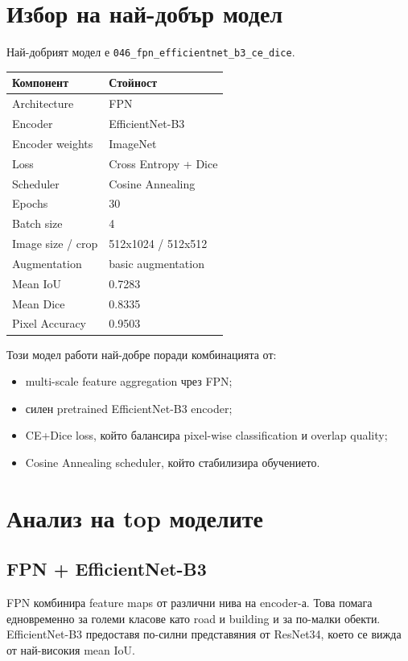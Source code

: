 \documentclass[12pt,a4paper]{article}
\newcommand{\code}[1]{\texttt{#1}}
\begin{document}
\section{Избор на най-добър модел}

Най-добрият модел е \code{046\_fpn\_efficientnet\_b3\_ce\_dice}.

\begin{longtable}{p{} p{}}
\toprule
Компонент & Стойност \\
\midrule
Architecture & FPN \\
Encoder & EfficientNet-B3 \\
Encoder weights & ImageNet \\
Loss & Cross Entropy + Dice \\
Scheduler & Cosine Annealing \\
Epochs & 30 \\
Batch size & 4 \\
Image size / crop & 512x1024 / 512x512 \\
Augmentation & basic augmentation \\
Mean IoU & 0.7283 \\
Mean Dice & 0.8335 \\
Pixel Accuracy & 0.9503 \\
\bottomrule
\end{longtable}

Този модел работи най-добре поради комбинацията от:

\begin{itemize}
  \item multi-scale feature aggregation чрез FPN;
  \item силен pretrained EfficientNet-B3 encoder;
  \item CE+Dice loss, който балансира pixel-wise classification и overlap quality;
  \item Cosine Annealing scheduler, който стабилизира обучението.
\end{itemize}

\section{Анализ на top моделите}

\subsection{FPN + EfficientNet-B3}

FPN комбинира feature maps от различни нива на encoder-а. Това помага едновременно за големи класове като road и building и за по-малки обекти. EfficientNet-B3 предоставя по-силни представяния от ResNet34, което се вижда от най-високия mean IoU.
\end{document}

